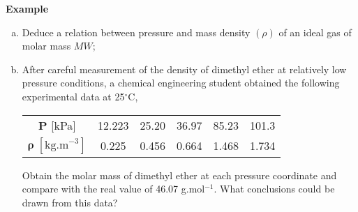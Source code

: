    \begin{MyExample}{\begin{center}{\bf Example}\end{center}}
     \begin{example}\label{Chapter:Intro_Property_of_Gases:Example3} \citep{Atkins_Book} 
       \begin{enumerate}[a)]
           \item Deduce a relation between pressure and mass density $\left(\rho\right)$ of an ideal gas of molar mass $MW$;
           \item After careful measurement of the density of dimethyl ether at relatively low pressure conditions, a chemical engineering student obtained the following experimental data at 25$^{\circ}$C,
               \begin{center}
                  \begin{tabular}{c c c c c c}
                     $\mathbf{P}$ [kPa]  & 12.223 & 25.20 & 36.97 & 85.23 & 101.3 \\
                     $\mathbf{\rho}\;\left[\text{kg.m}^{-3}\right]$ & 0.225  &  0.456  &  0.664 & 1.468 & 1.734  
                  \end{tabular}
               \end{center}
               Obtain the molar mass of dimethyl ether at each pressure coordinate and compare with the real value of 46.07 g.mol$^{-1}$. What conclusions could be drawn from this data?
       \end{enumerate}
     \end{example}



\end{MyExample}
